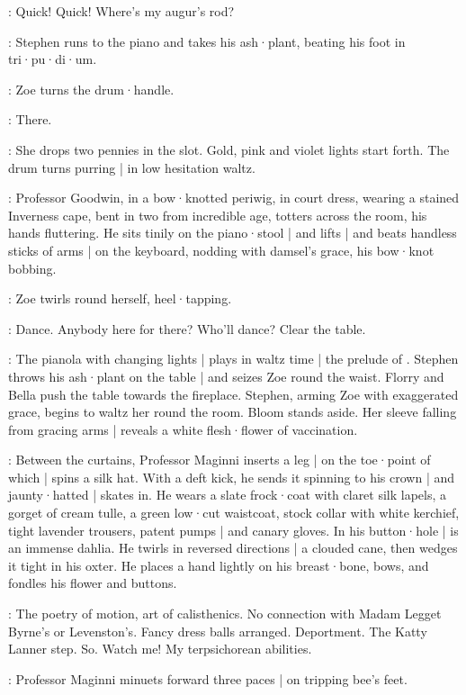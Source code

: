\Stephen:
Quick!
Quick!
Where's my augur's rod?

:
Stephen runs to the piano and takes his ash·plant,
beating his foot in tri·pu·di·um.

:
Zoe turns the drum·handle.

\Zoe:
There.

:
She drops two pennies in the slot.
Gold,
pink and violet lights start forth.
The drum turns purring |
in low hesitation waltz.

:
Professor Goodwin,
in a bow·knotted periwig,
in court dress,
wearing a stained Inverness cape,
bent in two from incredible age,
totters across the room,
his hands fluttering.
%
He sits tinily on the piano·stool |
and lifts |
and beats handless sticks of arms |
on the keyboard,
nodding with damsel's grace,
his bow·knot bobbing.

:
Zoe twirls round herself,
heel·tapping.

\Zoe:
Dance.
Anybody here for there?
Who'll dance?
Clear the table.

:
The pianola with changing lights |
plays in waltz time |
the prelude of .
Stephen throws his ash·plant on the table |
and seizes Zoe round the waist.
Florry and Bella push the table towards the fireplace.
Stephen,
arming Zoe with exaggerated grace,
begins to waltz her round the room.
Bloom stands aside.
%
Her sleeve falling from gracing arms |
reveals a white flesh·flower of vaccination.

:
Between the curtains,
Professor Maginni inserts a leg |
on the toe·point of which |
spins a silk hat.
With a deft kick,
he sends it spinning to his crown |
and jaunty·hatted |
skates in.
He wears a slate frock·coat with claret silk lapels,
a gorget of cream tulle,
a green low·cut waistcoat,
stock collar with white kerchief,
tight lavender trousers,
patent pumps |
and canary gloves.
In his button·hole |
is an immense dahlia.
He twirls in reversed directions |
a clouded cane,
then wedges it tight in his oxter.
He places a hand lightly on his breast·bone,
%
bows,
and fondles his flower and buttons.

\Maginni[6b]:
The poetry of motion,
art of calisthenics.
No connection with Madam Legget Byrne's or Levenston's.
Fancy dress balls arranged.
Deportment.
The Katty Lanner step.
So.
Watch me!
My terpsichorean abilities.

:
Professor Maginni minuets forward three paces |
on tripping bee's feet.

